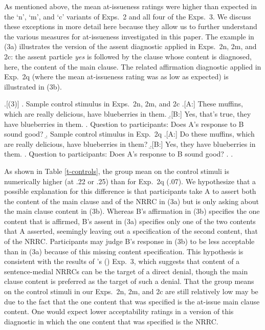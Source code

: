 \documentclass[a4paper,12pt,twoside]{article}
\newcommand{\posscite}[1]{\citeauthor{#1}'s (\citeyear{#1})}
\begin{document}
    As mentioned above, the mean at-issueness ratings were higher than expected in the `n', `m', and `c' variants of Exps.~2 and all four of the Exps.~3. We discuss these exceptions in more detail here because they allow us to further understand the various measures for at-issueness investigated in this paper. The example in (3a) illustrates the version of the assent diagnostic applied in Exps.~2n, 2m, and 2c: the assent particle {\em yes} is followed by the clause whose content is diagnosed, here, the content of the main clause. The related affirmation diagnostic applied in Exp.~2q (where the mean at-issueness rating was as low as expected) is illustrated in (3b).

    \ex.[(3)]
        \a. Sample control stimulus in Exps.~2n, 2m, and 2c
            \a.[A:] These muffins, which are really delicious, have blueberries in them.
            \b.[B:] Yes, that's true, they have blueberries in them.
            \z.
        Question to participants: Does A's response to B sound good?
        \b. Sample control stimulus in Exp.~2q
            \a.[A:] Do these muffins, which are really delicious, have blueberries in them?
            \b.[B:] Yes, they have blueberries in them.
            \z.
        Question to participants: Does A's response to B sound good?
        \z.
    \z.

    As shown in Table \ref{t-controls},  the group mean on the control stimuli is numerically higher (at .22 or .25) than for Exp.~2q (.07). We hypothesize that a possible explanation for this difference is that participants take A to assert both the content of the main clause and of the NRRC in (3a) but is only asking about the main clause content in (3b). Whereas B's affirmation in (3b) specifies the one content that is affirmed, B's assent in (3a) specifies only one of the two contents that A asserted, seemingly leaving out a specification of the second content, that of the NRRC. Participants may judge B's response in (3b) to be less acceptable than in (3a) because of this missing content specification. This hypothesis is consistent with the results of \posscite{syrett-koev2015} Exp.~3, which suggests that content of a sentence-medial NRRCs can be the target of a direct denial, though the main clause content is preferred as the target of such a denial. That the group means on the control stimuli in our Exps.~2n, 2m, and 2c are still relatively low may be due to the fact that the one content that was specified is the at-issue main clause content. One would expect lower acceptability ratings in a version of this diagnostic in which the one content that was specified is the NRRC.
\end{document}
